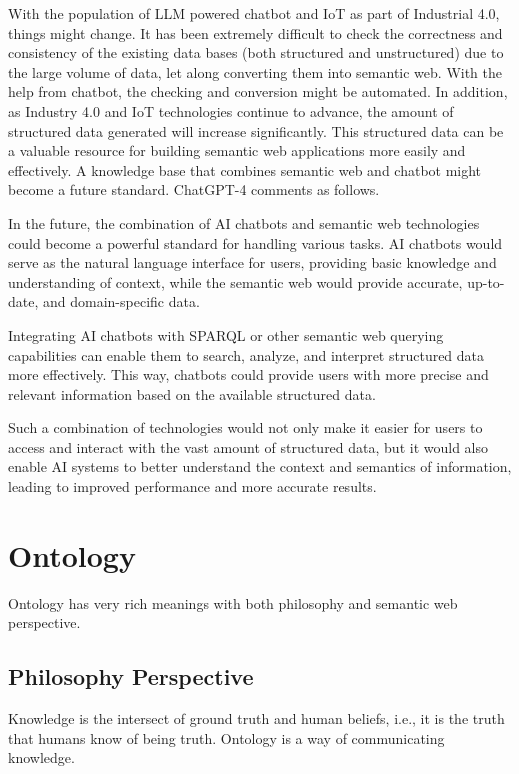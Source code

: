 With the population of LLM powered chatbot and IoT as part of Industrial 4.0, things might change. It has been extremely difficult to check the correctness and consistency of the existing data bases (both structured and unstructured) due to the large volume of data, let along converting them into semantic web. With the help from chatbot, the checking and conversion might be automated. In addition, as Industry 4.0 and IoT technologies continue to advance, the amount of structured data generated will increase significantly. This structured data can be a valuable resource for building semantic web applications more easily and effectively. A knowledge base that combines semantic web and chatbot might become a future standard. ChatGPT-4 comments as follows.

\begin{mdframed}
In the future, the combination of AI chatbots and semantic web technologies could become a powerful standard for handling various tasks. AI chatbots would serve as the natural language interface for users, providing basic knowledge and understanding of context, while the semantic web would provide accurate, up-to-date, and domain-specific data.

Integrating AI chatbots with SPARQL or other semantic web querying capabilities can enable them to search, analyze, and interpret structured data more effectively. This way, chatbots could provide users with more precise and relevant information based on the available structured data.

Such a combination of technologies would not only make it easier for users to access and interact with the vast amount of structured data, but it would also enable AI systems to better understand the context and semantics of information, leading to improved performance and more accurate results.
\end{mdframed}

\section{Ontology} \label{sec:ontology}

Ontology has very rich meanings with both philosophy and semantic web perspective.

\subsection{Philosophy Perspective}

Knowledge is the intersect of ground truth and human beliefs, i.e., it is the truth that humans know of being truth. Ontology is a way of communicating knowledge.

